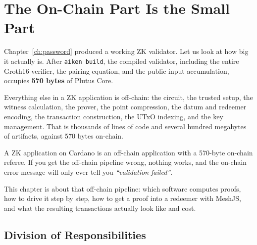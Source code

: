 
\section{The On-Chain Part Is the Small Part} \label{sec:ch7-small-part}

Chapter~\ref{ch:password} produced a working ZK validator. Let us look at how
big it actually is. After \texttt{aiken build}, the compiled validator,
including the entire Groth16 verifier, the pairing equation, and the public
input accumulation, occupies \textbf{570 bytes} of Plutus Core.

Everything else in a ZK application is off-chain: the circuit, the trusted
setup, the witness calculation, the prover, the point compression, the datum
and redeemer encoding, the transaction construction, the UTxO indexing, and the
key management. That is thousands of lines of code and several hundred megabytes
of artifacts, against 570 bytes on-chain.

\begin{highlight}
A ZK application on Cardano is an off-chain application with a 570-byte
on-chain referee. If you get the off-chain pipeline wrong, nothing works,
and the on-chain error message will only ever tell you \emph{``validation
failed''}.
\end{highlight}

This chapter is about that off-chain pipeline: which software computes proofs,
how to drive it step by step, how to get a proof into a redeemer with MeshJS,
and what the resulting transactions actually look like and cost.

\subsection*{Division of Responsibilities}

